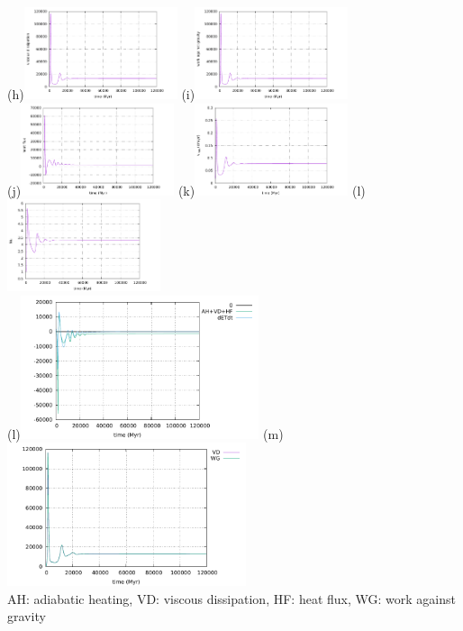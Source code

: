 \begin{center}
(h)\includegraphics[width=4.5cm]{python_codes/fieldstone_24/EBA_105/viscous_dissipation}
(i)\includegraphics[width=4.5cm]{python_codes/fieldstone_24/EBA_105/work_grav}\\
(j)\includegraphics[width=4.5cm]{python_codes/fieldstone_24/EBA_105/heat_flux}
(k)\includegraphics[width=4.5cm]{python_codes/fieldstone_24/EBA_105/vrms}
(l)\includegraphics[width=4.5cm]{python_codes/fieldstone_24/EBA_105/Nu}\\
(l)\includegraphics[width=7cm]{python_codes/fieldstone_24/EBA_105/conservation1}
(m)\includegraphics[width=7cm]{python_codes/fieldstone_24/EBA_105/conservation2}\\
AH: adiabatic heating, VD: viscous dissipation, HF: heat flux, WG: work against gravity
\end{center}


